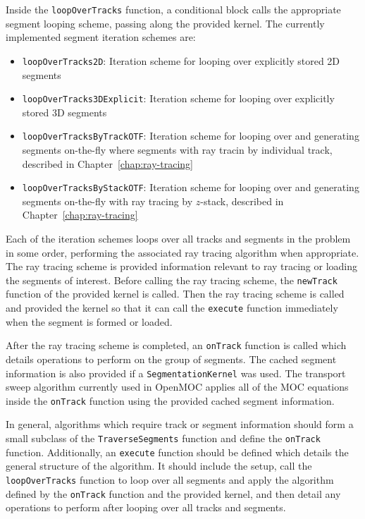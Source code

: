 Inside the \texttt{loopOverTracks} function, a conditional block calls the appropriate segment looping scheme, passing along the provided kernel. The currently implemented segment iteration schemes are:
\begin{itemize}
	\item \texttt{loopOverTracks2D}: Iteration scheme for looping over explicitly stored 2D segments
	\item \texttt{loopOverTracks3DExplicit}: Iteration scheme for looping over explicitly stored 3D segments
	\item \texttt{loopOverTracksByTrackOTF}: Iteration scheme for looping over and generating segments on-the-fly where segments with ray tracin by individual track, described in Chapter~\ref{chap:ray-tracing}
	\item \texttt{loopOverTracksByStackOTF}: Iteration scheme for looping over and generating segments on-the-fly with ray tracing by $z$-stack, described in Chapter~\ref{chap:ray-tracing}
\end{itemize}
Each of the iteration schemes loops over all tracks and segments in the problem in some order, performing the associated ray tracing algorithm when appropriate. The ray tracing scheme is provided information relevant to ray tracing or loading the segments of interest. Before calling the ray tracing scheme, the \texttt{newTrack} function of the provided kernel is called. Then the ray tracing scheme is called and provided the kernel so that it can call the \texttt{execute} function immediately when the segment is formed or loaded. 

After the ray tracing scheme is completed, an \texttt{onTrack} function is called which details operations to perform on the group of segments. The cached segment information is also provided if a \texttt{SegmentationKernel} was used. The transport sweep algorithm currently used in OpenMOC applies all of the \ac{MOC} equations inside the \texttt{onTrack} function using the provided cached segment information.

In general, algorithms which require track or segment information should form a small subclass of the \texttt{TraverseSegments} function and define the \texttt{onTrack} function. Additionally, an \texttt{execute} function should be defined which details the general structure of the algorithm. It should include the setup, call the \texttt{loopOverTracks} function to loop over all segments and apply the algorithm defined by the \texttt{onTrack} function and the provided kernel, and then detail any operations to perform after looping over all tracks and segments. 

